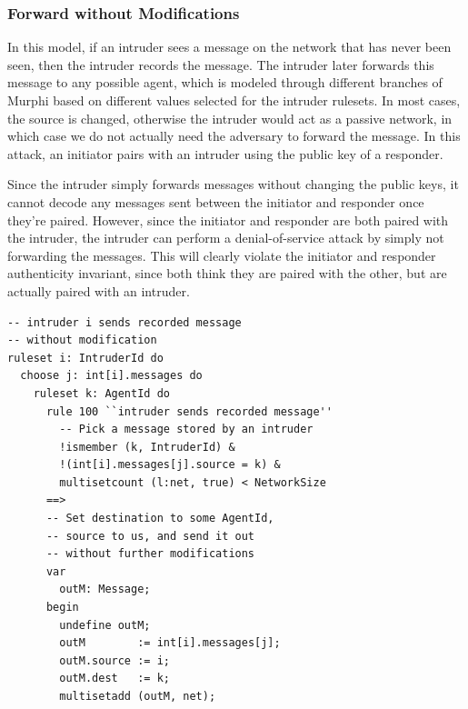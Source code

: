 \documentclass{acm_proc_article-sp}
\begin{document}
\subsubsection{Forward without Modifications}
In this model, if an intruder sees a message on the network that has never been seen, then the intruder records the message. The intruder later forwards this message to any possible agent, which is modeled through different branches of Murphi based on different values selected for the intruder rulesets. In most cases, the source is changed, otherwise the intruder would act as a passive network, in which case we do not actually need the adversary to forward the message. In this attack, an initiator pairs with an intruder using the public key of a responder.

Since the intruder simply forwards messages without changing the public keys, it cannot decode any messages sent between the initiator and responder once they're paired. However, since the initiator and responder are both paired with the intruder, the intruder can perform a denial-of-service attack by simply not forwarding the messages. This will clearly violate the initiator and responder authenticity invariant, since both think they are paired with the other, but are actually paired with an intruder.

\begin{verbatim}
-- intruder i sends recorded message
-- without modification
ruleset i: IntruderId do
  choose j: int[i].messages do
    ruleset k: AgentId do
      rule 100 ``intruder sends recorded message''
        -- Pick a message stored by an intruder
        !ismember (k, IntruderId) &
        !(int[i].messages[j].source = k) &
        multisetcount (l:net, true) < NetworkSize
      ==>
      -- Set destination to some AgentId,
      -- source to us, and send it out
      -- without further modifications
      var
        outM: Message;
      begin
        undefine outM;
        outM        := int[i].messages[j];
        outM.source := i;
        outM.dest   := k;
        multisetadd (outM, net);
\end{verbatim}
\end{document}
